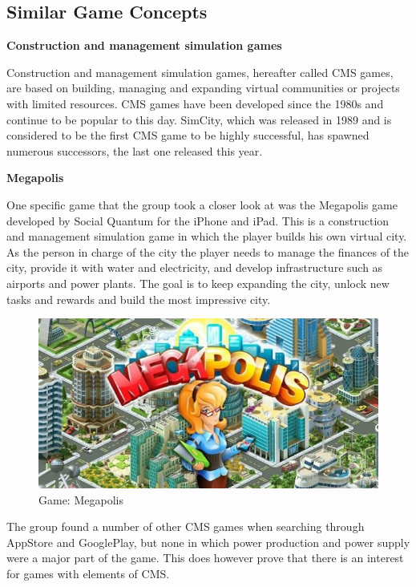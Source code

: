 \subsection{Similar Game Concepts}

{\bf Construction and management simulation games}

Construction and management simulation games, hereafter called CMS games, are based on building, managing and expanding virtual communities or projects with limited resources. CMS games have been developed since the 1980s and continue to be popular to this day. SimCity, which was released in 1989 and is considered to be the first CMS game to be highly successful, has spawned numerous successors, the last one released this year. \cite{wikiCMS}

{\bf Megapolis}

One specific game that the group took a closer look at was the Megapolis game developed by Social Quantum for the iPhone and iPad. This is a construction and management simulation game in which the player builds his own virtual city. As the person in charge of the city the player needs to manage the finances of the city, provide it with water and electricity, and develop infrastructure such as airports and power plants. The goal is to keep expanding the city, unlock new tasks and rewards and build the most impressive city. \cite{megapolis}

\begin{figure}[H]
	\centering
	\includegraphics[width=\textwidth]{pictures/megapolis.jpg}
	\caption{Game: Megapolis}
\end{figure}

The group found a number of other CMS games when searching through AppStore and GooglePlay, but none in which power production and power supply were a major part of the game. This does however prove that there is an interest for games
with elements of CMS.

